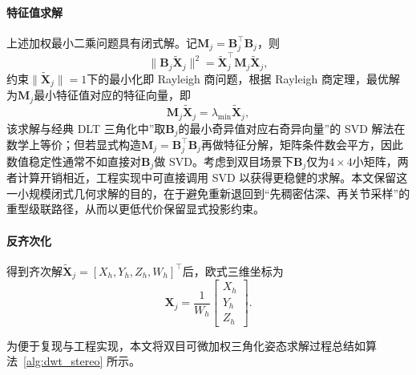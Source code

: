 \paragraph{特征值求解}
上述加权最小二乘问题具有闭式解。记$\mathbf{M}_j=\mathbf{B}_j^\top\mathbf{B}_j$，则
\begin{equation}
\|\mathbf{B}_j\tilde{\mathbf{X}}_j\|^2=\tilde{\mathbf{X}}_j^\top\mathbf{M}_j\tilde{\mathbf{X}}_j,
\label{eq:pdrm_quadratic}
\end{equation}
约束$\|\tilde{\mathbf{X}}_j\|=1$下的最小化即 Rayleigh 商问题，根据 Rayleigh 商定理，最优解为$\mathbf{M}_j$最小特征值对应的特征向量，即
\begin{equation}
\mathbf{M}_j\tilde{\mathbf{X}}_j=\lambda_{\min}\tilde{\mathbf{X}}_j,
\label{eq:pdrm_eig}
\end{equation}
该求解与经典 DLT 三角化中”取$\mathbf{B}_j$的最小奇异值对应右奇异向量”的 SVD 解法在数学上等价；但若显式构造$\mathbf{M}_j=\mathbf{B}_j^\top\mathbf{B}_j$再做特征分解，矩阵条件数会平方，因此数值稳定性通常不如直接对$\mathbf{B}_j$做 SVD。考虑到双目场景下$\mathbf{B}_j$仅为$4\times4$小矩阵，两者计算开销相近，工程实现中可直接调用 SVD 以获得更稳健的求解。本文保留这一小规模闭式几何求解的目的，在于避免重新退回到“先稠密估深、再关节采样”的重型级联路径，从而以更低代价保留显式投影约束。

\paragraph{反齐次化}
得到齐次解$\tilde{\mathbf{X}}_j=[X_h,Y_h,Z_h,W_h]^\top$后，欧式三维坐标为
\begin{equation}
\mathbf{X}_j=
\frac{1}{W_h}
\begin{bmatrix}
X_h\\
Y_h\\
Z_h
\end{bmatrix}.
\label{eq:pdrm_dehom}
\end{equation}

为便于复现与工程实现，本文将双目可微加权三角化姿态求解过程总结如算法~\ref{alg:dwt_stereo} 所示。

